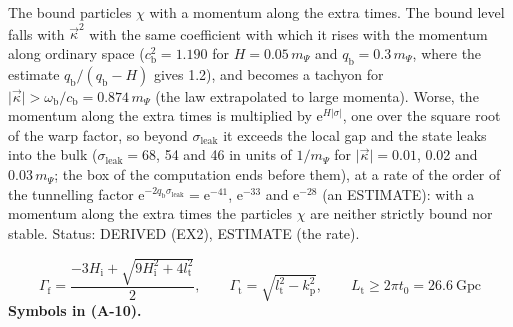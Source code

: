 \documentclass[
  10pt,
]{article}
\begin{document}
The bound particles \(\chi\) with a momentum along the extra times. The
bound level falls with \(\vec\kappa^2\) with the same coefficient with
which it rises with the momentum along ordinary space
(\(c_{\mathrm{b}}^2 = 1.190\) for \(H = 0.05\,m_\Psi\) and
\(q_{\mathrm{b}} = 0.3\,m_\Psi\), where the estimate
\(q_{\mathrm{b}}/(q_{\mathrm{b}} - H)\) gives 1.2), and becomes a
tachyon for
\(\lvert\vec\kappa\rvert > \omega_{\mathrm{b}}/c_{\mathrm{b}} = 0.874\,m_\Psi\)
(the law extrapolated to large momenta). Worse, the momentum along the
extra times is multiplied by \(\mathrm{e}^{H\lvert\sigma\rvert}\), one
over the square root of the warp factor, so beyond
\(\sigma_{\mathrm{leak}}\) it exceeds the local gap and the state leaks
into the bulk (\(\sigma_{\mathrm{leak}} = 68\), 54 and 46 in units of
\(1/m_\Psi\) for \(\lvert\vec\kappa\rvert = 0.01\), 0.02 and
\(0.03\,m_\Psi\); the box of the computation ends before them), at a
rate of the order of the tunnelling factor
\(\mathrm{e}^{-2q_{\mathrm{b}}\sigma_{\mathrm{leak}}} = \mathrm{e}^{-41}\),
\(\mathrm{e}^{-33}\) and \(\mathrm{e}^{-28}\) (an ESTIMATE): with a
momentum along the extra times the particles \(\chi\) are neither
strictly bound nor stable. Status: DERIVED (EX2), ESTIMATE (the rate).

\[
\Gamma_{\mathrm{f}} = \frac{-3H_{\mathrm{i}} + \sqrt{9H_{\mathrm{i}}^2 + 4l_{\mathrm{t}}^2}}{2},\qquad
\Gamma_{\mathrm{t}} = \sqrt{l_{\mathrm{t}}^2 - k_{\mathrm{p}}^2},\qquad L_{\mathrm{t}} \ge 2\pi t_0 = 26.6\ \text{Gpc} \tag{A-10}
\] \textbf{Symbols in (A-10).}
\end{document}
